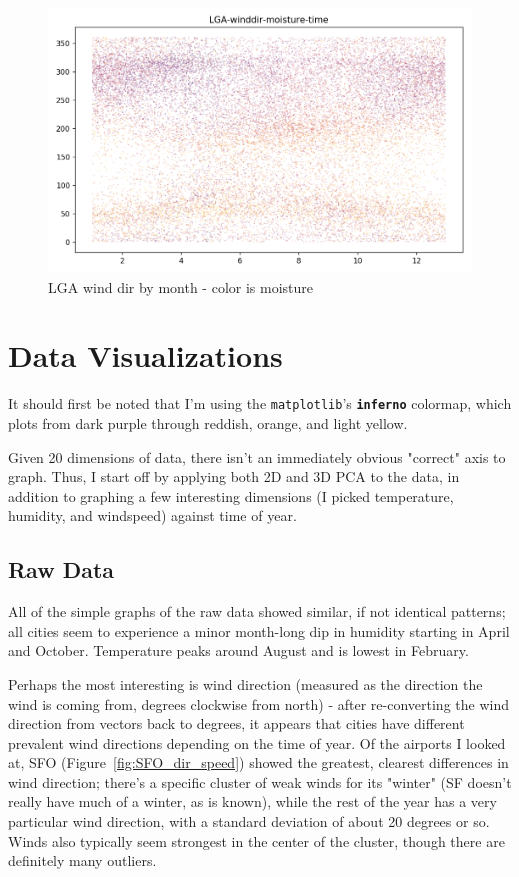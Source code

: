 \documentclass[a4paper]{article}
\begin{document}
\begin{figure}[t]
  \centering
  \includegraphics[width=\linewidth]{../png/basic-vis/LGA-winddir-moisture-time.png}
  \caption{LGA wind dir by month - color is moisture}
  \label{fig:LGA_dir_moisture}
\end{figure}

\section{Data Visualizations}

It should first be noted that I'm using the \texttt{matplotlib}'s \texttt{\textbf{inferno}} colormap, which plots from dark purple through reddish, orange, and light yellow.

Given 20 dimensions of data, there isn't an immediately obvious "correct" axis to graph. Thus, I start off by applying both 2D and 3D PCA to the data, in addition to graphing a few interesting dimensions (I picked temperature, humidity, and windspeed) against time of year.

\subsection{Raw Data}
All of the simple graphs of the raw data showed similar, if not identical patterns; all cities seem to experience a minor month-long dip in humidity starting in April and October. Temperature peaks around August and is lowest in February. 

Perhaps the most interesting is wind direction (measured as the direction the wind is coming from, degrees clockwise from north) - after re-converting the wind direction from vectors back to degrees, it appears that cities have different prevalent wind directions depending on the time of year. Of the airports I looked at, SFO (Figure~\ref{fig:SFO_dir_speed}) showed the greatest, clearest differences in wind direction; there's a specific cluster of weak winds for its "winter" (SF doesn't really have much of a winter, as is known), while the rest of the year has a very particular wind direction, with a standard deviation of about 20 degrees or so. Winds also typically seem strongest in the center of the cluster, though there are definitely many outliers. 
\end{document}
